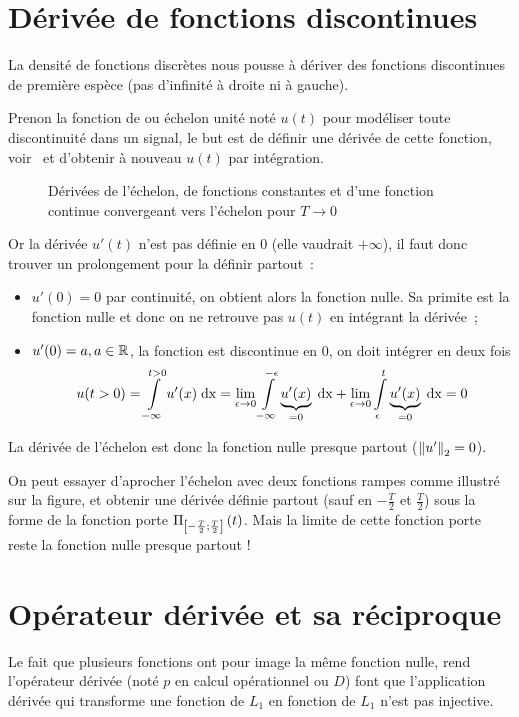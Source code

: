 \section{Dérivée de fonctions discontinues}
\label{sec:deriv_discontinues}
La densité de fonctions discrètes nous pousse à dériver des fonctions
discontinues de première espèce (pas d'infinité à droite ni à gauche).

Prenon la fonction de \Heaviside{} ou échelon unité noté $u(t)$ pour
modéliser toute discontinuité dans un signal, le but est de définir
une dérivée de cette fonction, voir~ et
d'obtenir à nouveau $u(t)$ par intégration.

\begin{figure}[ht!]
  \centering {}
  \caption{Dérivées de l'échelon, de fonctions constantes et d'une
    fonction continue convergeant vers l'échelon pour $T\to0$}
  \label{fig:derivee_echelon}
\end{figure}

Or la dérivée $u'(t)$ n'est pas définie en $0$ (elle vaudrait
$+\infty$), il faut donc trouver un prolongement pour la définir
partout~:
\begin{itemize}
\item $u'(0)=0$ par continuité, on obtient alors la fonction nulle. Sa
  primite est la fonction nulle et donc on ne retrouve pas $u(t)$ en
  intégrant la dérivée~;
\item $u'(0)=a, a\in \mathbb{R}$, la fonction est discontinue en $0$, on doit
  intégrer en deux
  fois
  $$u(t>0)=\int\limits_{-\infty}^{t>0}{u'(x)\;\mathrm{d{x}}}=\lim\limits_{\epsilon\to
    0}\int\limits_{-\infty}^{-\epsilon}{\underbrace{u'(x)}_{=0}\;\mathrm{d{x}}}+\lim\limits_{\epsilon\to
    0}\int\limits_{\epsilon}^{t}{\underbrace{u'(x)}_{=0}\;\mathrm{d{x}}}=0$$
\end{itemize}

La dérivée de l'échelon est donc la fonction nulle \og{} presque
partout \fg{} ($\left\|u'\right\|_2=0$).

On peut essayer d'aprocher l'échelon avec deux fonctions rampes comme
illustré sur la figure, et obtenir une dérivée définie partout (sauf
en $-\frac{T}{2}$ et $\frac{T}{2}$) sous la forme de la fonction porte
$\Pi_{\left[-\frac{T}{2} ; \frac{T}{2}\right]}\left(t\right)$. Mais la limite de cette
fonction porte reste la fonction nulle presque partout !


\section{Opérateur dérivée et sa réciproque}
\label{sec:dirac_derivee}
Le fait que plusieurs fonctions ont pour image la même fonction nulle,
rend l'opérateur dérivée (noté $p$ en calcul opérationnel ou $D$) font
que l'application dérivée qui transforme une fonction de $L_1$ en
fonction de $L_1$ n'est pas injective.

